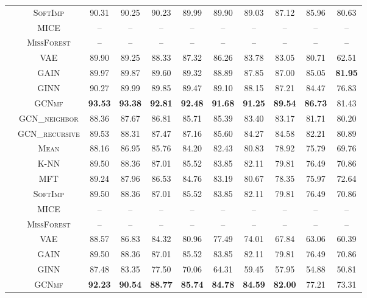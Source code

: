 \begin{table}[!p]
{\begin{tabular}{c|c|ccccccccc}
& \textsc{SoftImp} & {90.31} & {90.25} & {90.23} & {89.99} & {89.90} & {89.03} & 87.12 & {85.96} & 80.63\\
& \textsc{MICE} & -- & -- & -- & -- & -- & -- & -- & -- & --\\
& \textsc{MissForest} & -- & -- & -- & -- & -- & -- & -- & -- & --\\
& \textsc{VAE} & 89.90 & 89.25 & 88.33 & 87.32 & 86.26 & 83.78 & 83.05 & 80.71 & 62.51\\
& \textsc{GAIN} & 89.97 & 89.87 & 89.60 & 89.32 & 88.89 & 87.85 & 87.00 & 85.05 & \textbf{81.95}\\
& \textsc{GINN} & 90.27 & 89.99 & 89.85 & 89.47 & 89.10 & 88.15 & 87.21 & 84.47 & 76.83\\
& \textsc{GCNmf} & \textbf{93.53} & \textbf{93.38} & \textbf{92.81} & \textbf{92.48} & \textbf{91.68} & \textbf{91.25} & \textbf{89.54} & \textbf{86.73} & {81.43}\\ 
& \textsc{GCN\_neighbor} & 88.36 & 87.67 & 86.81 & 85.71 & 85.39 & 83.40 & 83.17 & 81.71 & 80.20 \\
& \textsc{GCN\_recursive} & 89.53 & 88.31 & 87.47 & 87.16 & 85.60 & 84.27 & 84.58 & 82.21 & 80.89 \\
\midrule
{} & \textsc{Mean} & 88.16 & 86.95 & 85.76 & 84.20 & 82.43 & 80.83 & 78.92 & 75.79 & 69.76\\
& \textsc{K-NN} & {89.50} & {88.36} & {87.01} & {85.52} & {83.85} & {82.11} & {79.81} & {76.49} & 70.86\\
& \textsc{MFT} & 89.24 & 87.96 & 86.53 & 84.76 & 83.19 & 80.67 & 78.35 & 75.97 & {72.64}\\
& \textsc{SoftImp} & {89.50} & {88.36} & {87.01} & {85.52} & {83.85} & {82.11} & {79.81} & {76.49} & 70.86\\
& \textsc{MICE} & -- & -- & -- & -- & -- & -- & -- & -- & --\\
& \textsc{MissForest} & -- & -- & -- & -- & -- & -- & -- & -- & --\\
& \textsc{VAE} & 88.57 & 86.83 & 84.32 & 80.96 & 77.49 & 74.01 & 67.84 & 63.06 & 60.39\\
& \textsc{GAIN} & {89.50} & {88.36} & {87.01} & {85.52} & {83.85} & {82.11} & {79.81} & {76.49} & 70.86\\
& \textsc{GINN} & 87.48 & 83.35 & 77.50 & 70.06 & 64.31 & 59.45 & 57.95 & 54.88 & 50.81\\
& \textsc{GCNmf} & \textbf{92.23} & \textbf{90.54} & \textbf{88.77} & \textbf{85.74} & \textbf{84.78} & \textbf{84.59} & \textbf{82.00} & 77.21 & 73.31\\ 

\end{tabular}}
\end{table}
